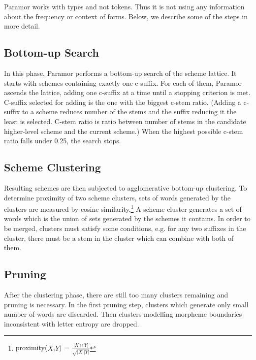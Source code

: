 \documentclass{itatnew}
\begin{document}
\noindent
Paramor works with types and not tokens. Thus it is not using any information about the frequency or context of forms.
%
Below, we describe some of the steps in more detail.

\subsection{Bottom-up Search}

\noindent
In this phase, Paramor performs a bottom-up search of the scheme lattice. It starts with schemes containing exactly one c-suffix. For each of them, Paramor ascends the lattice, adding one c-suffix at a time until a stopping criterion is met. C-suffix selected for adding is the one with the biggest c-stem ratio. (Adding a c-suffix to a scheme reduces number of the stems and the suffix reducing it the least is selected. C-stem ratio is ratio between number of stems in the candidate higher-level scheme and the current scheme.) When the highest possible c-stem ratio falls under 0.25, the search stops.

\subsection{Scheme Clustering}

\noindent
Resulting schemes are then subjected to agglomerative bottom-up clustering. To determine proximity of two scheme clusters, sets of words generated by the clusters are measured by cosine similarity.\footnote{proximity($X$,$Y$) = $\frac{|X \cap Y|}{\sqrt{|X||Y|}}$} A scheme cluster generates a set of words which is the union of sets generated by the schemes it contains. In order to be merged, clusters must satisfy some conditions, e.g. for any two suffixes in the cluster, there must be a stem in the cluster which can combine with both of them.

\subsection{Pruning}

\noindent
After the clustering phase, there are still too many clusters remaining and pruning is necessary. In the first pruning step, clusters which generate only small number of words are discarded. 
Then clusters modelling morpheme boundaries inconsistent with letter entropy are dropped.
\end{document}
